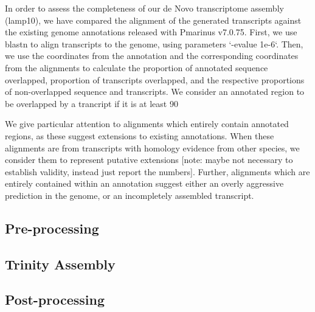 \documentclass{article}
\begin{document}
In order to assess the completeness of our de Novo transcriptome assembly (lamp10), we have compared the alignment of the generated transcripts against the existing genome annotations released with Pmarinus v7.0.75. First, we use blastn to align transcripts to the genome, using parameters `-evalue 1e-6`. Then, we use the coordinates from the annotation and the corresponding coordinates from the alignments to calculate the proportion of annotated sequence overlapped, proportion of transcripts overlapped, and the respective proportions of non-overlapped sequence and transcripts. We consider an annotated region to be overlapped by a trancript if it is at least 90%

We give particular attention to alignments which entirely contain annotated regions, as these suggest extensions to existing annotations. When these alignments are from transcripts with homology evidence from other species, we consider them to represent putative extensions [note: maybe not necessary to establish validity, instead just report the numbers]. Further, alignments which are entirely contained within an annotation suggest either an overly aggressive prediction in the genome, or an incompletely assembled transcript. 



\subsection*{Pre-processing}


\subsection*{Trinity Assembly}

\subsection*{Post-processing}


\end{document}
